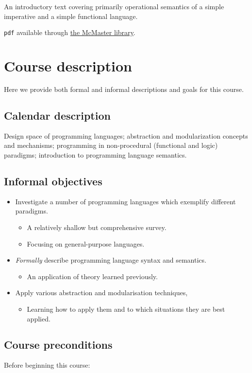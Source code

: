 \documentclass[11pt]{article}
\begin{document}
An introductory text covering primarily operational semantics
of a simple imperative and a simple functional language.

\texttt{pdf} available through
\href{http://discovery.mcmaster.ca/iii/encore/record/C\_\_Rb2200622}{the McMaster library}.

\section{Course description}
\label{sec:org2c210f9}
Here we provide both formal and informal descriptions
and goals for this course.

\subsection{Calendar description}
\label{sec:orga68247f}
Design space of programming languages;
abstraction and modularization concepts and mechanisms;
programming in non-procedural (functional and logic) paradigms;
introduction to programming language semantics.

\subsection{Informal objectives}
\label{sec:org399ba99}
\begin{itemize}
\item Investigate a number of programming languages
which exemplify different paradigms.
\begin{itemize}
\item A relatively shallow but comprehensive survey.
\item Focusing on general-purpose languages.
\end{itemize}
\item \emph{Formally} describe programming language syntax and semantics.
\begin{itemize}
\item An application of theory learned previously.
\end{itemize}
\item Apply various abstraction and modularisation techniques,
\begin{itemize}
\item Learning how to apply them and
to which situations they are best applied.
\end{itemize}
\end{itemize}

\subsection{Course preconditions}
\label{sec:org4ae2ca9}
Before beginning this course:
\end{document}
